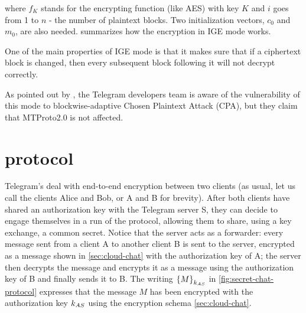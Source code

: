 where $f_K$ stands for the encrypting function (like AES) with key $K$
and $i$ goes from 1 to $n$ - the number of plaintext blocks. Two initialization vectors, $c_0$ and $m_0$, are also needed.  summarizes how the encryption in IGE mode works.


One of the main properties of IGE mode is that it makes sure that if a ciphertext block is changed, then every subsequent block following it will not decrypt correctly.

As pointed out by \cite{Telegram-AFAQ-IGE}, the Telegram developers team is aware of the vulnerability of this mode to blockwise-adaptive Chosen Plaintext Attack (CPA)\cite{IGE-CPA}, but they claim that MTProto2.0 is not affected.




\section{\Schat{} protocol}
\label{sec:secret-chat}

Telegram's \schats{} deal with end-to-end encryption between two clients (as usual, let us call the clients Alice and Bob, or A and B for brevity). After both clients have shared an authorization key with the Telegram server S, they can decide to engage themselves in a run of the \schat{} protocol, allowing them to share, using a \DiHe{} key exchange, a common secret. Notice that the server acts as a forwarder: every message sent from a client A to another client B is sent to the server, encrypted as a \cchat{} message shown in \cref{sec:cloud-chat} with the authorization key of A; the server then decrypts the message and encrypts it as a \cchat{} message using the authorization key of B and finally sends it to B. The writing $\left\{M\right\}_{k_{AS}}$ in \cref{fig:secret-chat-protocol} expresses that the message $M$ has been encrypted with the authorization key $k_{AS}$ using the \cchat{} encryption schema \cref{sec:cloud-chat}.

